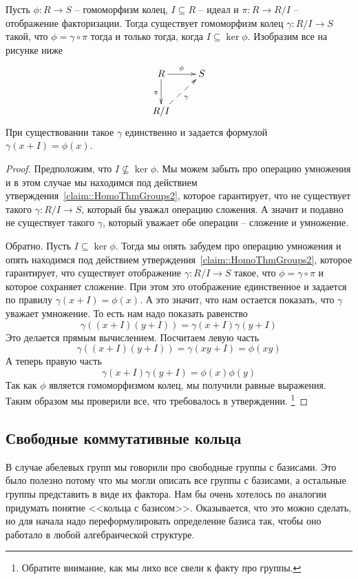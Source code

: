 \begin{claim}
Пусть $\phi\colon R\to S$ -- гомоморфизм колец, $I\subseteq R$ -- идеал и $\pi \colon R\to R/I$ -- отображение факторизации. Тогда существует гомоморфизм колец $\gamma \colon R/I \to S$ такой, что $\phi = \gamma \circ \pi$ тогда и только тогда, когда $I 
\subseteq \ker \phi$. Изобразим все на рисунке ниже
\[
\xymatrix{
	{R}\ar[r]^{\phi}\ar[d]_{\pi}&{S}\\
	{R/I}\ar@{-->}[ru]_{\gamma}&{}
}
\]
При существовании такое $\gamma$ единственно и задается формулой $\gamma(x + I) = \phi(x)$.
\end{claim}
\begin{proof}
Предположим, что $I\not\subseteq \ker \phi$.
Мы можем забыть про операцию умножения и в этом случае мы находимся под действием утверждения~\ref{claim::HomoThmGroups2}, которое гарантирует, что не существует такого $\gamma\colon R/I\to S$, который бы уважал операцию сложения.
А значит и подавно не существует такого $\gamma$, который уважает обе операции -- сложение и умножение.

Обратно.
Пусть $I\subseteq \ker \phi$. Тогда мы опять забудем про операцию умножения и опять находимся под действием утверждения~\ref{claim::HomoThmGroups2}, которое гарантирует, что существует отображение $\gamma \colon R/I \to S$ такое, что $\phi = \gamma\circ \pi$ и которое сохраняет сложение.
При этом это отображение единственное и задается по правилу $\gamma(x + I) = \phi(x)$.
А это значит, что нам остается показать, что $\gamma$ уважает умножение.
То есть нам надо показать равенство
\[
\gamma((x+I) (y+I)) = \gamma(x + I) \gamma(y + I)
\]
Это делается прямым вычислением.
Посчитаем левую часть
\[
\gamma((x+I) (y+I)) = \gamma(xy + I) = \phi(xy)
\]
А теперь правую часть
\[
\gamma(x + I) \gamma(y + I) = \phi(x) \phi(y)
\]
Так как $\phi$ является гомоморфизмом колец, мы получили равные выражения.
Таким образом мы проверили все, что требовалось в утверждении.%
\footnote{Обратите внимание, как мы лихо все свели к факту про группы.}
\end{proof}

\subsection{Свободные коммутативные кольца}

В случае абелевых групп мы говорили про свободные группы с базисами.
Это было полезно потому что мы могли описать все группы с базисами, а остальные группы представить в виде их фактора.
Нам бы очень хотелось по аналогии придумать понятие <<кольца с базисом>>.
Оказывается, что это можно сделать, но для начала надо переформулировать определение базиса так, чтобы оно работало в любой алгебраической структуре.

